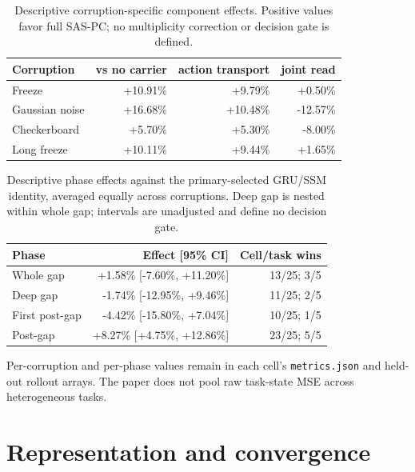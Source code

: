 \begin{table}[H]
\centering
\caption{Descriptive corruption-specific component effects. Positive values favor full SAS-PC; no multiplicity correction or decision gate is defined.}
\label{tbl:secondary-components}
\small
\begin{tabular}{@{}lrrr@{}}
\toprule
\textcolor{NVIDIADark}{\textbf{Corruption}} & \textcolor{NVIDIADark}{\textbf{vs no carrier}} & \textcolor{NVIDIADark}{\textbf{action transport}} & \textcolor{NVIDIADark}{\textbf{joint read}} \\
\midrule
Freeze & +10.91\% & +9.79\% & +0.50\% \\
Gaussian noise & +16.68\% & +10.48\% & -12.57\% \\
Checkerboard & +5.70\% & +5.30\% & -8.00\% \\
Long freeze & +10.11\% & +9.44\% & +1.65\% \\
\bottomrule
\end{tabular}
\end{table}

\begin{table}[H]
\centering
\caption{Descriptive phase effects against the primary-selected GRU/SSM identity, averaged equally across corruptions. Deep gap is nested within whole gap; intervals are unadjusted and define no decision gate.}
\label{tbl:secondary-phases}
\small
\begin{tabular}{@{}lrr@{}}
\toprule
\textcolor{NVIDIADark}{\textbf{Phase}} & \textcolor{NVIDIADark}{\textbf{Effect [95\% CI]}} & \textcolor{NVIDIADark}{\textbf{Cell/task wins}} \\
\midrule
Whole gap & +1.58\% [-7.60\%, +11.20\%] & 13/25; 3/5 \\
Deep gap & -1.74\% [-12.95\%, +9.46\%] & 11/25; 2/5 \\
First post-gap & -4.42\% [-15.80\%, +7.04\%] & 10/25; 1/5 \\
Post-gap & +8.27\% [+4.75\%, +12.86\%] & 23/25; 5/5 \\
\bottomrule
\end{tabular}
\end{table}

Per-corruption and per-phase values remain in each cell's
\texttt{metrics.json} and held-out rollout arrays. The paper does not
pool raw task-state MSE across heterogeneous tasks.

\section{Representation and
convergence}\label{representation-and-convergence}

